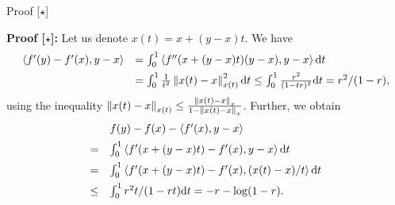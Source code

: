 \documentclass[9pt]{beamer}
\begin{document}
\begin{frame}{Proof [$\star$]}

    \textbf{Proof [$\star$]:} Let us denote $x(t)=x+(y-x)t$. We have
  \[
    \begin{array}{rl}
      \left<f'(y)-f'(x),  y-x\right> & = \int_0^1 \left<f''(x+(y-x)t)(y-x), y-x\right>{\mathrm{d}} t\\[0.5em]
                                & = \int_0^1 \frac{1}{t^2} \left\|x(t)-x\right\|_{x(t)}^2{\mathrm{d}} t\leq \int_0^1 \frac{r^2}{(1-tr)^2} {\mathrm{d}} t = r^2/(1-r),
    \end{array}
  \]
  using the inequality $\left\|x(t)-x\right\|_{x(t)}\leq \frac{\left\|x(t)-x\right\|_{x}}{1-\left\|x(t)-x\right\|_{x}}$.
  Further, we obtain
  \[
    \begin{array}{rl}
      & f(y) - f(x) - \left<f'(x),  y-x\right>\\[0.5em]
      = &  \int_0^1 \left<f'(x+(y-x)t)-f'(x),  y-x\right>{\mathrm{d}} t\\[0.5em]
      = &\int_0^1 \left<f'(x+(y-x)t)-f'(x),  (x(t)-x)/t\right> {\mathrm{d}} t\\[0.5em]
      \leq & \int_0^1 r^2t/(1-rt){\mathrm{d}} t = -r-\log(1-r).
    \end{array}
  \]

\end{frame}
\end{document}
